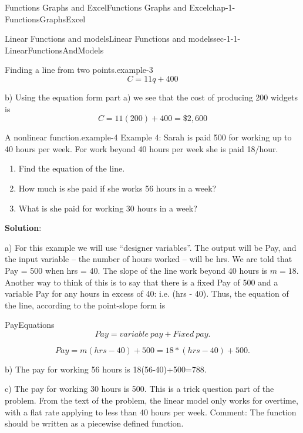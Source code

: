 \documentclass[oneside,10pt,]{book}
\newcommand{\terminology}[1]{\textbf{#1}}
\numberwithin{equation}{section}
\begin{document}
\begin{chapterptx}{Functions Graphs and Excel}{}{Functions Graphs and Excel}{}{}{chap-1-FunctionsGraphsExcel}
\begin{sectionptx}{Linear Functions and models}{}{Linear Functions and models}{}{}{sec-1-1-LinearFunctionsAndModels}
\begin{example}{Finding a line from two points.}{example-3}
\begin{equation*}
C=11 q+400
\end{equation*}
%
\par
\hypertarget{p-54}{}%
b) Using the equation form part a) we see that the cost of producing 200 widgets is%
\begin{equation*}
C=11 (200)+400=\$2,600
\end{equation*}
%
\end{example}
\begin{example}{A nonlinear function.}{example-4}%
\hypertarget{p-55}{}%
Example 4:  Sarah is paid \textdollar{}500 for working up to 40 hours per week.  For work beyond 40 hours per week she is paid \textdollar{}18\slash{}hour.%
\leavevmode%
\begin{enumerate}[label=(\alph*)]
\item\hypertarget{li-19}{}\hypertarget{p-56}{}%
Find the equation of the line.%
\item\hypertarget{li-20}{}\hypertarget{p-57}{}%
How much is she paid if she works 56 hours in a week?%
\item\hypertarget{li-21}{}\hypertarget{p-58}{}%
What is she paid for working 30 hours in a week?%
\end{enumerate}
\hypertarget{p-59}{}%
\terminology{Solution}:%
\par
\hypertarget{p-60}{}%
a) For this example we will use “designer variables”. The output will be Pay, and the input variable – the number of hours worked – will be hrs. We are told that Pay = 500 when hrs = 40. The slope of the line work beyond 40 hours is \(m=18\).  Another way to think of this is to say that there is a fixed Pay of \textdollar{}500 and a variable Pay for any hours in excess of 40: i.e. (hrs - 40). Thus, the equation of the line, according to the point-slope form is \begin{assemblage}{}{PayEquations}%
\hypertarget{p-61}{}%
%
\begin{equation*}
Pay=variable\  pay+Fixed\  pay.
\end{equation*}
%
\end{assemblage}
%
\begin{equation*}
Pay=m(hrs-40)+500=18*(hrs-40)+500.
\end{equation*}
%
\par
\hypertarget{p-62}{}%
b) The pay for working 56 hours is 18(56-40)+500=\textdollar{}788.%
\par
\hypertarget{p-63}{}%
c) The pay for working 30 hours is \textdollar{}500.  This is a trick question part of the problem.  From the text of the problem, the linear model only works for overtime, with a flat rate applying to less than 40 hours per week. Comment: The function should be written as a piecewise defined function.%

\end{example}
\end{sectionptx}
\end{chapterptx}
\end{document}

